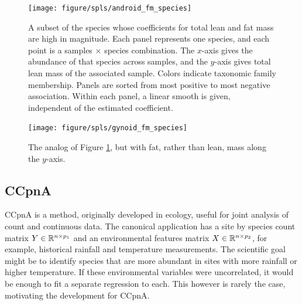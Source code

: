 \documentclass[14pt]{extarticle}
\begin{document}
\begin{figure}
  \centering
  \texttt{[image: figure/spls/android\_fm\_species]}
  \caption{A subset of the species whose coefficients for total lean and fat
    mass are high in magnitude. Each panel represents one species, and each
    point is a samples $\times$ species combination. The $x$-axis gives the
    abundance of that species across samples, and the $y$-axis gives total lean
    mass of the associated sample. Colors indicate taxonomic family membership.
    Panels are sorted from most positive to most negative association. Within
    each panel, a linear smooth is given, independent of the estimated
    coefficient.
    \label{fig:spls_android_fm_species} }
\end{figure}


\begin{figure}
  \centering
  \texttt{[image: figure/spls/gynoid\_fm\_species]}
  \caption{
    The analog of Figure \ref{fig:spls_android_fm_species}, but with fat, rather
    than lean, mass along the $y$-axis. \label{fig:spls_gynoid_fm_species}
  }
\end{figure}

\subsection{CCpnA}
\label{subsec:canonical-correspondence}

CCpnA is a method, originally developed in ecology, useful for joint analysis of
count and continuous data. The canonical application has a site by species count
matrix $Y \in \mathbb{R}^{n \times p_{1}}$ and an environmental features matrix $X
\in \mathbb{R}^{n \times p_{2}}$, for example, historical rainfall and temperature
measurements. The scientific goal might be to identify species that are more
abundant in sites with more rainfall or higher temperature. If these
environmental variables were uncorrelated, it would be enough to fit a separate
regression to each. This however is rarely the case, motivating the development
for CCpnA.
\end{document}
